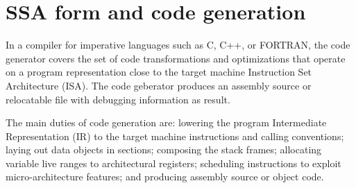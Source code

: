 \chapter{SSA form and code generation }
\label{chapter:ssa-codegen}

In a compiler for imperative languages such as C, C++, or FORTRAN, the code
generator covers the set of code transformations and optimizations that operate
on a program representation close to the target machine Instruction Set
Architecture (ISA). The code geberator produces an
assembly source or relocatable file with debugging information as result.

The main duties of code generation are: lowering the program Intermediate
Representation (IR) to the target machine instructions and calling conventions;
laying out data objects in sections; composing the stack frames; allocating
variable live ranges to architectural registers; scheduling instructions to
exploit micro-architecture features; and producing assembly source or object code.

